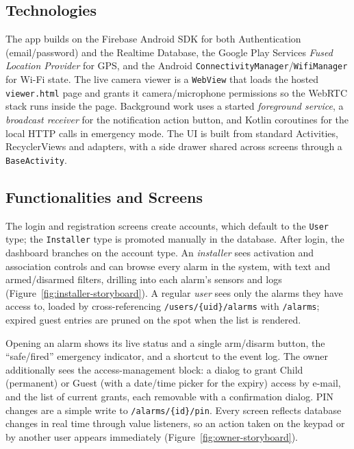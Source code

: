 \documentclass[10pt,twocolumn]{article}
\begin{document}
\subsection{Technologies}
The app builds on the Firebase Android SDK for both Authentication (email/password) and the Realtime Database, the Google Play Services \emph{Fused Location Provider} for GPS, and the Android \texttt{ConnectivityManager}/\texttt{WifiManager} for Wi-Fi state. The live camera viewer is a \texttt{WebView} that loads the hosted \texttt{viewer.html} page and grants it camera/microphone permissions so the WebRTC stack runs inside the page. Background work uses a started \emph{foreground service}, a \emph{broadcast receiver} for the notification action button, and Kotlin coroutines for the local HTTP calls in emergency mode. The UI is built from standard Activities, RecyclerViews and adapters, with a side drawer shared across screens through a \texttt{BaseActivity}.

\subsection{Functionalities and Screens}
The login and registration screens create accounts, which default to the \texttt{User} type; the \texttt{Installer} type is promoted manually in the database. After login, the dashboard branches on the account type. An \emph{installer} sees activation and association controls and can browse every alarm in the system, with text and armed/disarmed filters, drilling into each alarm's sensors and logs (Figure~\ref{fig:installer-storyboard}). A regular \emph{user} sees only the alarms they have access to, loaded by cross-referencing \texttt{/users/\{uid\}/alarms} with \texttt{/alarms}; expired guest entries are pruned on the spot when the list is rendered.

Opening an alarm shows its live status and a single arm/disarm button, the ``safe/fired'' emergency indicator, and a shortcut to the event log. The owner additionally sees the access-management block: a dialog to grant Child (permanent) or Guest (with a date/time picker for the expiry) access by e-mail, and the list of current grants, each removable with a confirmation dialog. PIN changes are a simple write to \texttt{/alarms/\{id\}/pin}. Every screen reflects database changes in real time through value listeners, so an action taken on the keypad or by another user appears immediately (Figure~\ref{fig:owner-storyboard}).
\end{document}
